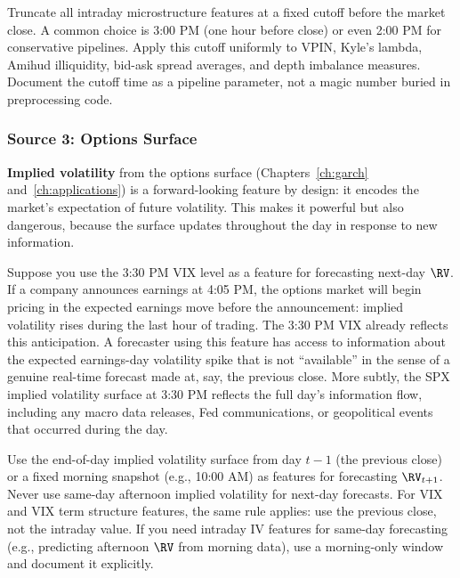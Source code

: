 \begin{keyidea}
Truncate all intraday microstructure features at a fixed cutoff before the market close.
A common choice is 3:00 PM (one hour before close) or even 2:00 PM for conservative pipelines.
Apply this cutoff uniformly to VPIN, Kyle's lambda, Amihud illiquidity, bid-ask spread averages, and depth imbalance measures.
Document the cutoff time as a pipeline parameter, not a magic number buried in preprocessing code.
\end{keyidea}


\subsubsection{Source 3: Options Surface}

\textbf{Implied volatility} from the options surface (Chapters~\ref{ch:garch} and~\ref{ch:applications}) is a forward-looking feature by design: it encodes the market's expectation of future volatility.
This makes it powerful but also dangerous, because the surface updates throughout the day in response to new information.

\begin{warning}
Suppose you use the 3:30 PM VIX level as a feature for forecasting next-day $\RV$.
If a company announces earnings at 4:05 PM, the options market will begin pricing in the expected earnings move before the announcement: implied volatility rises during the last hour of trading.
The 3:30 PM VIX already reflects this anticipation.
A forecaster using this feature has access to information about the expected earnings-day volatility spike that is not ``available'' in the sense of a genuine real-time forecast made at, say, the previous close.
More subtly, the SPX implied volatility surface at 3:30 PM reflects the full day's information flow, including any macro data releases, Fed communications, or geopolitical events that occurred during the day.
\end{warning}

\begin{keyidea}
Use the end-of-day implied volatility surface from day $t-1$ (the previous close) or a fixed morning snapshot (e.g., 10:00 AM) as features for forecasting $\RV_{t+1}$.
Never use same-day afternoon implied volatility for next-day forecasts.
For VIX and VIX term structure features, the same rule applies: use the previous close, not the intraday value.
If you need intraday IV features for same-day forecasting (e.g., predicting afternoon $\RV$ from morning data), use a morning-only window and document it explicitly.
\end{keyidea}


